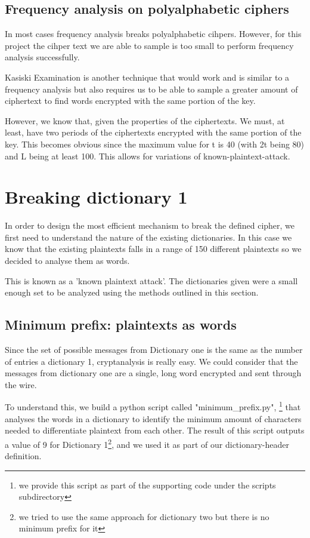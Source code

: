 \documentclass[pdftex,12pt,letter]{article}
\begin{document}
\subsection{Frequency analysis on polyalphabetic ciphers}

In most cases frequency analysis breaks polyalphabetic cihpers. However,
for this project the cihper text we are able to sample is too small to 
perform frequency analysis successfully. 

Kasiski Examination is another technique that would work and is similar to 
a frequency analysis but also requires us to be able to sample a greater amount 
of ciphertext to find words encrypted with the same portion of the key.

However, we know that, given the properties of the ciphertexts. We must, at least,
have two periods of the ciphertexts encrypted with the same portion of the key. This
becomes obvious since the maximum value for t is 40 (with 2t being 80) and L being at
least 100. This allows for variations of known-plaintext-attack.

\section{Breaking dictionary 1}

In order to design the most efficient mechanism to break the defined cipher, we 
first need to understand the nature of the existing dictionaries. In this case
we know that the existing plaintexts falls in a range of 150 different plaintexts
so we decided to analyse them as words.

This is known as a 'known plaintext attack'. The dictionaries given were a small 
enough set to be analyzed using the methods outlined in this section. 

\subsection{Minimum prefix: plaintexts as words}

Since the set of possible messages from Dictionary one is the same as the
number of entries a dictionary 1, cryptanalysis is really easy. We could
consider that the messages from dictionary one are a single, long word
encrypted and sent through the wire.

To understand this, we build a python script called "minimum\_prefix.py",
\footnote{ we provide this script as part of the supporting code under the
scripts subdirectory} that analyses the words in a dictionary to identify the
minimum amount of characters needed to differentiate plaintext from each other.
The result of this script outputs a value of 9 for Dictionary 1\footnote{we
tried to use the same approach for dictionary two but there is no minimum
prefix for it}, and we used it as part of our dictionary-header definition.
\end{document}
